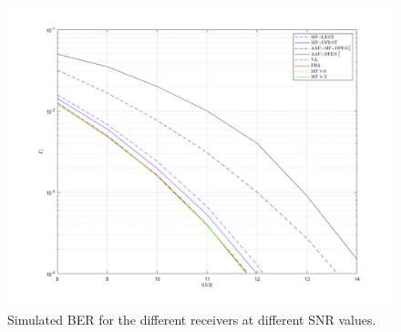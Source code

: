 \documentclass[a4paper, 12pt]{report}
\begin{document}
\begin{figure}[H]
	\centering
	\includegraphics[width=15cm]{images/PevsGamma}
	\caption{Simulated BER for the different receivers at different SNR values.}\label{Pe}
\end{figure}
\end{document}
